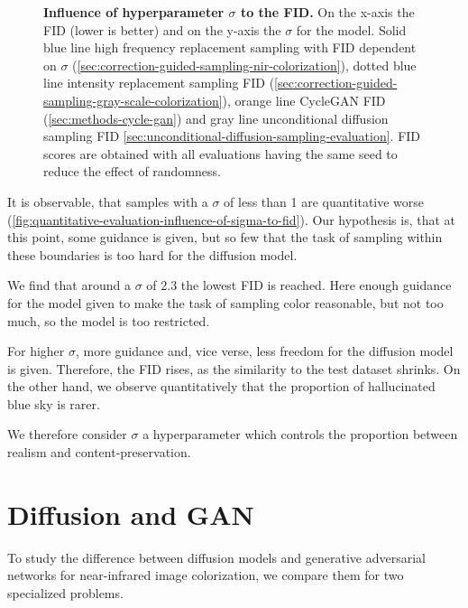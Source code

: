\begin{figure}[htp!]
    \begin{center}
        
    \end{center}
    \caption{
        \textbf{Influence of hyperparameter $\sigma$ to the FID.}
        On the x-axis the FID (lower is better) and on the y-axis the $\sigma$ for the model.
        \textcolor{ub-blue}{Solid blue line} high frequency replacement sampling with FID dependent on $\sigma$ (\autoref{sec:correction-guided-sampling-nir-colorization}),
        \textcolor{ub-blue}{dotted blue line} intensity replacement sampling FID (\autoref{sec:correction-guided-sampling-gray-scale-colorization}),
        \textcolor{ub-yellow}{orange line} CycleGAN FID (\autoref{sec:methods-cycle-gan}) and \textcolor{ub-gray}{gray line} unconditional diffusion sampling FID \autoref{sec:unconditional-diffusion-sampling-evaluation}.
        FID scores are obtained with all evaluations having the same seed to reduce the effect of randomness.
    }
    \label{fig:quantitative-evaluation-influence-of-sigma-to-fid}
\end{figure}

It is observable, that samples with a $\sigma$ of less than 1 are quantitative worse (\autoref{fig:quantitative-evaluation-influence-of-sigma-to-fid}).
Our hypothesis is, that at this point, some guidance is given, but so few that the task of sampling within these boundaries is too hard for the diffusion model.

We find that around a $\sigma$ of $2.3$ the lowest FID is reached.
Here enough guidance for the model given to make the task of sampling color reasonable, but not too much, so the model is too restricted.

For higher $\sigma$, more guidance and, vice verse, less freedom for the diffusion model is given.
Therefore, the FID rises, as the similarity to the test dataset shrinks.
On the other hand, we observe quantitatively that the proportion of hallucinated blue sky is rarer.

We therefore consider $\sigma$ a hyperparameter which controls the proportion between realism and content-preservation.

\section{Diffusion and GAN}
\label{sec:diffusion-vs-cyclegan}
To study the difference between diffusion models and generative adversarial networks for near-infrared image colorization, we compare them for two specialized problems.

